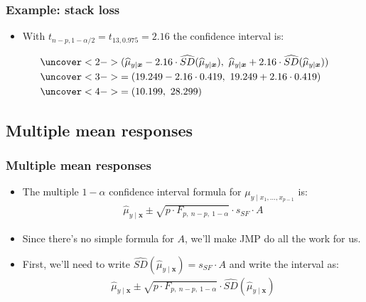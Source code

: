 \documentclass[handout]{beamer}\usepackage{graphicx, color}
\providecommand{\vc}[1]{\boldsymbol{#1}}
\providecommand{\wh}[1]{\widehat{#1}}
\numberwithin{equation}{section}
\begin{document}
\begin{frame}
\frametitle{Example: stack loss}
\begin{itemize}
\item With $t_{n - p, 1 - \alpha/2} = t_{13, 0.975} = 2.16$ the confidence interval is:
\end{itemize}
\begin{align*}
&\uncover<2->{(\wh{\mu}_{y \mid \vc{x}} - 2.16 \cdot \wh{SD}(\wh{\mu}_{y \mid \vc{x}}), \ \wh{\mu}_{y \mid \vc{x}} + 2.16 \cdot \wh{SD}(\wh{\mu}_{y \mid \vc{x}}))} \\
&\uncover<3->{= (19.249 - 2.16 \cdot 0.419, \ 19.249 + 2.16 \cdot 0.419)} \\
&\uncover<4->{= (10.199, \ 28.299)}
\end{align*}
\begin{itemize}
\end{itemize}
\end{frame}



\subsection{Multiple mean responses}

\begin{frame}
\frametitle{Multiple mean responses}
\begin{itemize}
\item The multiple $1 - \alpha$ confidence interval formula for $\mu_{y \mid x_1, \ldots, x_{p-1}}$ is:
\begin{align*}
\wh{\mu}_{y \mid \vc{x}} \pm \sqrt{p \cdot F_{p, \ n - p, \ 1 - \alpha }} \cdot s_{SF} \cdot A
\end{align*}
\pause \item Since there's no simple formula for $A$, we'll make JMP do all the work for us.
\pause \item First, we'll need to write $\wh{SD}(\wh{\mu}_{y \mid \vc{x}}) = s_{SF} \cdot A$ and write the interval as:
\begin{align*}
\wh{\mu}_{y \mid \vc{x}} \pm \sqrt{p \cdot F_{p, \ n - p, \ 1 - \alpha}} \cdot \wh{SD}(\wh{\mu}_{y \mid \vc{x}})
\end{align*}
\end{itemize}
\end{frame}
\end{document}
